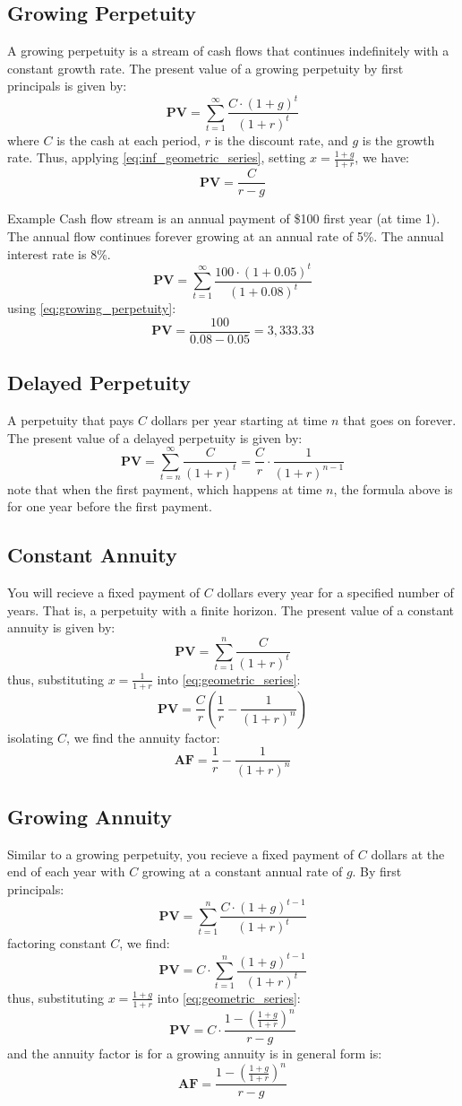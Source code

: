 \subsection{Growing Perpetuity}
A growing perpetuity is a stream of cash flows that continues indefinitely with a constant growth rate. The present value of a growing perpetuity by first principals is given by:
$$
\textbf{PV} = \sum_{t=1}^{\infty} \frac{C \cdot (1 + g)^t}{(1 + r)^t}
$$
where $C$ is the cash at each period, $r$ is the discount rate, and $g$ is the growth rate. Thus, applying \eqref{eq:inf_geometric_series}, setting $x = \frac{1 + g}{1 + r}$, we have:
\begin{equation}\label{eq:growing_perpetuity}
\textbf{PV} = \frac{C}{r - g}
\end{equation}
\begin{examplebox}{Example}
	Cash flow stream is an annual payment of \$100 first year (at time 1). The annual flow continues forever growing at an annual rate of 5\%. The annual interest rate is 8\%.
	$$
	\textbf{PV} = \sum_{t=1}^{\infty} \frac{100 \cdot (1 + 0.05)^t}{(1 + 0.08)^t}
	$$
	using \eqref{eq:growing_perpetuity}:
	$$
	\textbf{PV} = \frac{100}{0.08 - 0.05} = 3,333.33
	$$
\end{examplebox}
\subsection{Delayed Perpetuity}
A perpetuity that pays $C$ dollars per year starting at time $n$ that goes on forever. The present value of a delayed perpetuity is given by:
$$
\textbf{PV} = \sum_{t=n}^{\infty} \frac{C}{(1 + r)^t} = \frac{C}{r} \cdot \frac{1}{(1 + r)^{n-1}}
$$
note that when the first payment, which happens at time $n$, the formula above is for one year before the first payment.
\subsection{Constant Annuity}
You will recieve a fixed payment of $C$ dollars every year for a specified number of years. That is, a perpetuity with a finite horizon. The present value of a constant annuity is given by:
$$
\textbf{PV} = \sum_{t=1}^{n} \frac{C}{(1 + r)^t} 
$$
thus, substituting $x=\frac{1}{1+r}$ into \eqref{eq:geometric_series}:
$$
\textbf{PV} = \frac{C}{r} \left(\frac{1}{r} - \frac{1}{(1 + r)^n}\right)
$$
isolating $C$, we find the annuity factor:
$$
\textbf{AF} = \frac{1}{r} - \frac{1}{(1 + r)^n}
$$
\subsection{Growing Annuity}
Similar to a growing perpetuity, you recieve a fixed payment of $C$ dollars at the end of each year with $C$ growing at a constant annual rate of $g$. By first principals:
$$
\textbf{PV} = \sum_{t=1}^{n} \frac{C \cdot (1 + g)^{t-1}}{(1 + r)^t}
$$
factoring constant $C$, we find:
$$
\textbf{PV} = C \cdot \sum_{t=1}^{n} \frac{(1 + g)^{t-1}}{(1 + r)^t}
$$
thus, substituting $x = \frac{1 + g}{1 + r}$ into \eqref{eq:geometric_series}:
$$
\textbf{PV} = C \cdot \frac{1 - \left(\frac{1 + g}{1 + r}\right)^n}{r - g}
$$
and the annuity factor is for a growing annuity is in general form is:
$$
\textbf{AF} = \frac{1 - \left(\frac{1 + g}{1 + r}\right)^n}{r - g}
$$
